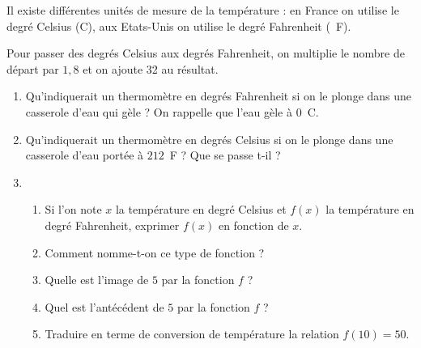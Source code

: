 
\medskip
 
Il existe différentes unités de mesure de la température : en France on utilise le degré Celsius (\degres C), aux Etats-Unis on utilise le degré Fahrenheit (\degres~F).

\medskip
 
Pour passer des degrés Celsius aux degrés Fahrenheit, on multiplie le nombre de départ par $1,8$ et on ajoute 32 au résultat.

\medskip
 
\begin{enumerate}
\item Qu'indiquerait un thermomètre en degrés Fahrenheit si on le plonge dans une casserole d'eau qui gèle ? On rappelle que l'eau gèle à 0~\degres C. 
\item Qu'indiquerait un thermomètre en degrés Celsius si on le plonge dans une 
casserole d'eau portée à $212$~\degres F ? Que se passe t-il ? 
\item 
	\begin{enumerate}
		\item Si l'on note $x$ la température en degré Celsius et $f(x)$ la température en degré Fahrenheit, exprimer $f(x)$ en fonction de $x$. 
		\item Comment nomme-t-on ce type de fonction ? 
		\item Quelle est l'image de $5$ par la fonction $f$ ? 
		\item Quel est l'antécédent de $5$ par la fonction $f$ ? 
		\item Traduire en terme de conversion de température la relation $f(10) = 50$.
	\end{enumerate} 
\end{enumerate}
